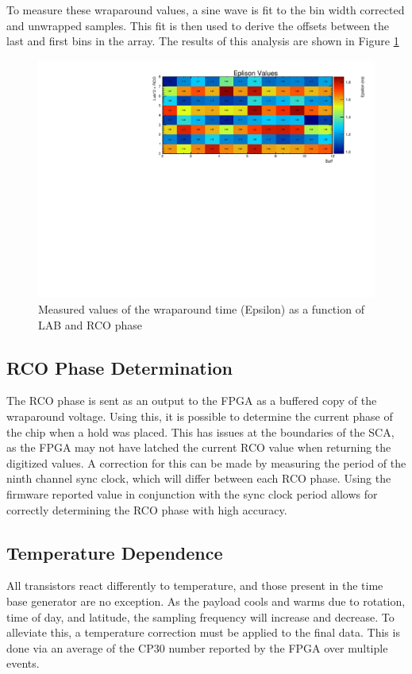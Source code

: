 		To measure these wraparound values, a sine wave is fit to the bin width corrected and unwrapped samples.  This fit is then used to derive the offsets between the last and first bins in the array.  The results of this analysis are shown in Figure \ref{fig:epsilonValues}
		
		
	\begin{figure}
		\includegraphics[width=\textwidth]{figures/epsilons}
		\caption{Measured values of the wraparound time (Epsilon) as a function of LAB and RCO phase}
		\label{fig:epsilonValues}
	\end{figure}

		
		
	\subsection{RCO Phase Determination}
		The RCO phase is sent as an output to the FPGA as a buffered copy of the wraparound voltage.  Using this, it is possible to determine the current phase of the chip when a hold was placed.  This has issues at the boundaries of the SCA, as the FPGA may not have latched the current RCO value when returning the digitized values.  A correction for this can be made by measuring the period of the ninth channel sync clock, which will differ between each RCO phase.  Using the firmware reported value in conjunction with the sync clock period allows for correctly determining the RCO phase with high accuracy.

	\subsection{Temperature Dependence}	
		All transistors react differently to temperature, and those present in the time base generator are no exception.  As the payload cools and warms due to rotation, time of day, and latitude, the sampling frequency will increase and decrease.  To alleviate this, a temperature correction must be applied to the final data. This is done via an average of the CP30 number reported by the FPGA over multiple events.
		

